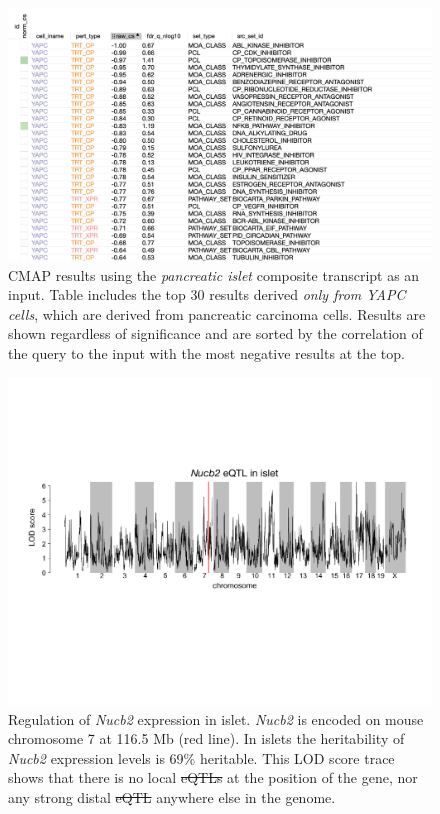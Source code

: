 \documentclass[
]{article}
\providecommand{\DIFaddtex}[1]{{\protect\color{blue}\uwave{#1}}} %
\providecommand{\DIFdeltex}[1]{{\protect\color{red}\sout{#1}}}                      %
\providecommand{\DIFaddFL}[1]{\DIFadd{#1}} %
\providecommand{\DIFdelFL}[1]{\DIFdel{#1}} %
\providecommand{\DIFaddbeginFL}{} %
\providecommand{\DIFaddendFL}{} %
\providecommand{\DIFdelbeginFL}{} %
\providecommand{\DIFdelendFL}{} %
\providecommand{\DIFadd}[1]{\texorpdfstring{\DIFaddtex{#1}}{#1}} %
\providecommand{\DIFdel}[1]{\texorpdfstring{\DIFdeltex{#1}}{}} %
\newcommand{\DIFscaledelfig}{0.5}
\newlength{\DIFdelgraphicswidth} %
\newlength{\DIFdelgraphicsheight} %
\newcommand{\DIFaddincludegraphics}[2][]{{\color{blue}\fbox{\DIFOincludegraphics[#1]{#2}}}} %
\newcommand{\DIFdelincludegraphics}[2][]{%
\sbox{\DIFdelgraphicsbox}{\DIFOincludegraphics[#1]{#2}}%
\settoboxwidth{\DIFdelgraphicswidth}{\DIFdelgraphicsbox} %
\settoboxtotalheight{\DIFdelgraphicsheight}{\DIFdelgraphicsbox} %
\scalebox{\DIFscaledelfig}{%
\parbox[b]{\DIFdelgraphicswidth}{\usebox{\DIFdelgraphicsbox}\\[-\baselineskip] \rule{\DIFdelgraphicswidth}{0em}}\llap{\resizebox{\DIFdelgraphicswidth}{\DIFdelgraphicsheight}{%
\setlength{\unitlength}{\DIFdelgraphicswidth}%
\begin{picture}(1,1)%
\thicklines\linethickness{2pt} %
{\color[rgb]{1,0,0}\put(0,0){\framebox(1,1){}}}%
{\color[rgb]{1,0,0}\put(0,0){\line( 1,1){1}}}%
{\color[rgb]{1,0,0}\put(0,1){\line(1,-1){1}}}%
\end{picture}%
}\hspace*{3pt}}} %
} %
\DeclareRobustCommand{\DIFaddbeginFL}{\DIFOaddbeginFL \let\includegraphics\DIFaddincludegraphics} %
\DeclareRobustCommand{\DIFaddendFL}{\DIFOaddendFL \let\includegraphics\DIFOincludegraphics} %
\DeclareRobustCommand{\DIFdelbeginFL}{\DIFOdelbeginFL \let\includegraphics\DIFdelincludegraphics} %
\DeclareRobustCommand{\DIFdelendFL}{\DIFOaddendFL \let\includegraphics\DIFOincludegraphics} %
\begin{document}
\begin{figure}[ht!]
\includegraphics[width=\textwidth]{Figures/Supp_Fig_Islet_YAPC.png} 
\caption{CMAP results using the \textit{pancreatic islet} composite 
transcript as an input. Table includes the top 30 results derived
\textit{only from YAPC cells}, which are derived from pancreatic
carcinoma cells. Results are shown regardless of significance and
are sorted by the correlation of the query to the input 
with the most negative results at the top.
}
\label{fig:clue_islet_yapc}
\end{figure}

\begin{figure}[ht!]
\includegraphics[width=\textwidth]{Figures/Supplemental_FigX_Nucb2_eQTL.pdf} 
\caption{Regulation of \textit{Nucb2} expression in islet. \textit{Nucb2} 
is encoded on mouse chromosome 7 at 116.5 Mb (red line). In islets the 
heritability of \textit{Nucb2} expression levels is 69\% heritable. This 
LOD score trace shows that there is no local \DIFdelbeginFL \DIFdelFL{eQTLs }\DIFdelendFL \DIFaddbeginFL \DIFaddFL{eQTL }\DIFaddendFL at the position of the
gene, nor any strong distal \DIFdelbeginFL \DIFdelFL{eQTL }\DIFdelendFL \DIFaddbeginFL \DIFaddFL{eQTLs }\DIFaddendFL anywhere else in the genome. 
}
\label{fig:Nucb2_eqtl}
\end{figure}

\clearpage



\end{document}
